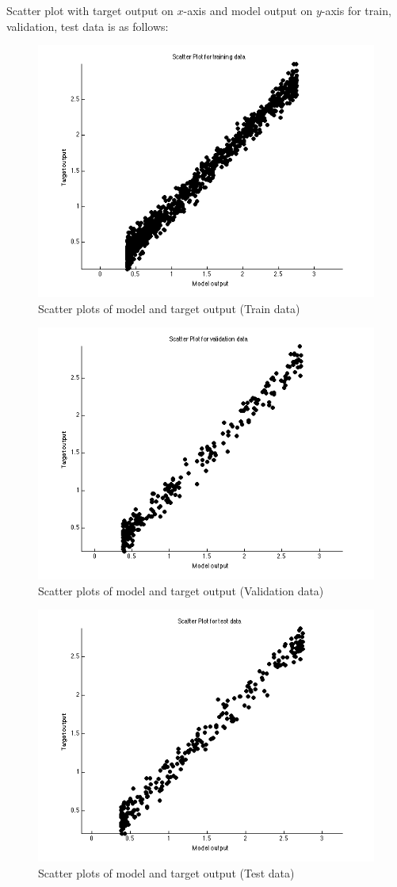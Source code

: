 \documentclass{article}
\begin{document}
Scatter plot with target output on $x$-axis and model output on $y$-axis for train, validation, test data is as follows:

\begin{figure}[H]
\centering
\includegraphics[width=0.5\linewidth]{Regression/rbfnn_univariate/scatter_train.png}
\caption{Scatter plots of model and target output (Train data)}
\end{figure}

\begin{figure}[H]
\centering
\includegraphics[width=0.5\linewidth]{Regression/rbfnn_univariate/scatter_val.png}
\caption{Scatter plots of model and target output (Validation data)}
\end{figure}

\begin{figure}[H]
\centering
\includegraphics[width=0.5\linewidth]{Regression/rbfnn_univariate/scatter_test.png}
\caption{Scatter plots of model and target output (Test data)}
\end{figure}
\end{document}
